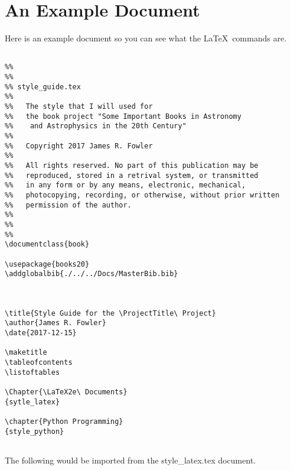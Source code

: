 \section{An Example Document}

Here is an example document so you can see what the \LaTeX\ commands are.

\begin{verbatim}

%%
%%
%% style_guide.tex
%%
%%   The style that I will used for 
%%   the book project "Some Important Books in Astronomy
%%    and Astrophysics in the 20th Century"
%%
%%   Copyright 2017 James R. Fowler
%%
%%   All rights reserved. No part of this publication may be
%%   reproduced, stored in a retrival system, or transmitted
%%   in any form or by any means, electronic, mechanical,
%%   photocopying, recording, or otherwise, without prior written
%%   permission of the author.
%%
%%
%%
\documentclass{book}

\usepackage{books20}
\addglobalbib{./../../Docs/MasterBib.bib}



\title{Style Guide for the \ProjectTitle\ Project}
\author{James R. Fowler}
\date{2017-12-15}

\maketitle
\tableofcontents
\listoftables 

\Chapter{\LaTeX2e\ Documents}
{sytle_latex}

\chapter{Python Programming}
{style_python}


\end{verbatim}

 The following would be imported from  the style\_latex.tex document.

